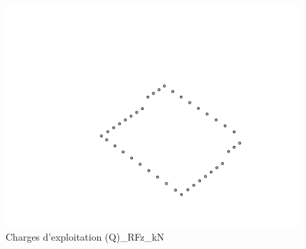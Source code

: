     \begin{figure}[H] %
        \centering %
        \includegraphics[width=\textwidth]{assets/img/graph3D_charges_cas_2_RFz_kN.png} %
        \caption{Charges d'exploitation (Q)\_RFz\_kN} %
    \end{figure}

    